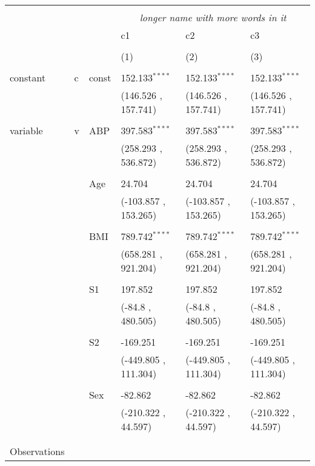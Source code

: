 \begin{table}[!htbp] \centering
  \label{}
\begin{tabularx}{\textwidth}{lllXXX}
\\[-1.8ex]\hline
\hline \\[-1.8ex]
&&&\multicolumn{3}{c}{\textit{longer name with more words in it}} \
\cr \cline{4-6}
\\[-1.8ex]&&& \multicolumn{1}{l}{c1} & \multicolumn{1}{l}{c2} & \multicolumn{1}{l}{c3}  \\
\\[-1.8ex] & && (1) & (2) & (3) \\
\hline \\[-1.8ex]
 constant&c&const& 152.133$^{****}$ & 152.133$^{****}$ & 152.133$^{****}$ \\
&&&(146.526 , 157.741)&(146.526 , 157.741)&(146.526 , 157.741)\\
  & & & \\
 variable&v&ABP& 397.583$^{****}$ & 397.583$^{****}$ & 397.583$^{****}$ \\
&&&(258.293 , 536.872)&(258.293 , 536.872)&(258.293 , 536.872)\\
  & & & \\
 &&Age& 24.704$^{}$ & 24.704$^{}$ & 24.704$^{}$ \\
&&&(-103.857 , 153.265)&(-103.857 , 153.265)&(-103.857 , 153.265)\\
  & & & \\
 &&BMI& 789.742$^{****}$ & 789.742$^{****}$ & 789.742$^{****}$ \\
&&&(658.281 , 921.204)&(658.281 , 921.204)&(658.281 , 921.204)\\
  & & & \\
 &&S1& 197.852$^{}$ & 197.852$^{}$ & 197.852$^{}$ \\
&&&(-84.8 , 480.505)&(-84.8 , 480.505)&(-84.8 , 480.505)\\
  & & & \\
 &&S2& -169.251$^{}$ & -169.251$^{}$ & -169.251$^{}$ \\
&&&(-449.805 , 111.304)&(-449.805 , 111.304)&(-449.805 , 111.304)\\
  & & & \\
 &&Sex& -82.862$^{}$ & -82.862$^{}$ & -82.862$^{}$ \\
&&&(-210.322 , 44.597)&(-210.322 , 44.597)&(-210.322 , 44.597)\\
  & & & \\
\hline \\[-1.8ex]
 Observations\quad\quad &&&   &   &   \\

\end{tabularx}
\end{table}
